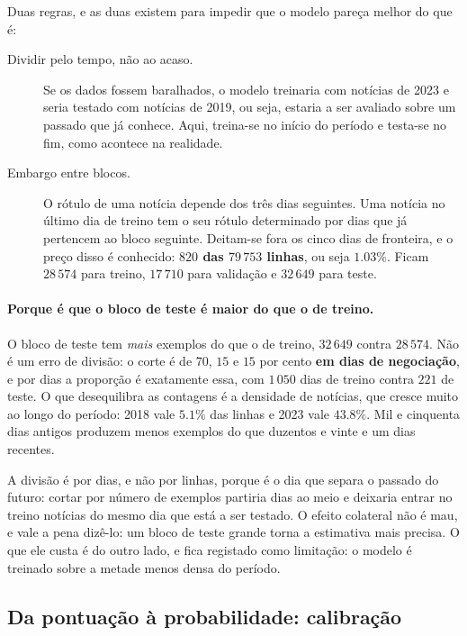 Duas regras, e as duas existem para impedir que o modelo pareça melhor do que é:

\begin{description}
  \item[Dividir pelo tempo, não ao acaso.] Se os dados fossem baralhados, o modelo treinaria com
        notícias de 2023 e seria testado com notícias de 2019, ou seja, estaria a ser avaliado sobre um
        passado que já conhece. Aqui, treina-se no início do período e testa-se no fim, como
        acontece na realidade.
  \item[Embargo entre blocos.] O rótulo de uma notícia depende dos três dias seguintes. Uma notícia
        no último dia de treino tem o seu rótulo determinado por dias que já pertencem ao bloco
        seguinte. Deitam-se fora os cinco dias de fronteira, e o preço disso é conhecido:
        \textbf{$820$ das $79\,753$ linhas}, ou seja $1.03\%$. Ficam $28\,574$ para treino,
        $17\,710$ para validação e $32\,649$ para teste.
\end{description}

\paragraph{Porque é que o bloco de teste é maior do que o de treino.}
O bloco de teste tem \emph{mais} exemplos do que o de treino, $32\,649$ contra $28\,574$. Não é
um erro de divisão: o corte é de $70$, $15$ e $15$ por cento \textbf{em dias de negociação}, e
por dias a proporção é exatamente essa, com $1\,050$ dias de treino contra $221$ de teste. O que
desequilibra as contagens é a densidade de notícias, que cresce muito ao longo do período: 2018
vale $5.1\%$ das linhas e 2023 vale $43.8\%$. Mil e cinquenta dias antigos produzem menos
exemplos do que duzentos e vinte e um dias recentes.

A divisão é por dias, e não por linhas, porque é o dia que separa o passado do futuro: cortar por
número de exemplos partiria dias ao meio e deixaria entrar no treino notícias do mesmo dia que
está a ser testado. O efeito colateral não é mau, e vale a pena dizê-lo: um bloco de teste grande
torna a estimativa mais precisa. O que ele custa é do outro lado, e fica registado como
limitação: o modelo é treinado sobre a metade menos densa do período.

\subsection{Da pontuação à probabilidade: calibração}
\label{sec:met_calibracao}

